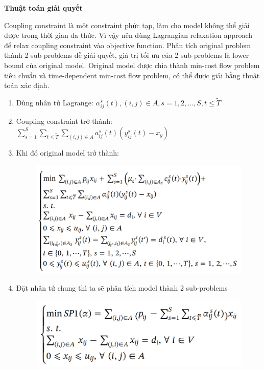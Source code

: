 \documentclass[a4paper]{article}
\begin{document}
\textbf{Thuật toán giải quyết}

{Coupling constraint là một constraint phức tạp, làm cho model không thể giải được trong thời gian đa thức. Vì vậy nên dùng Lagrangian relaxation approach để relax coupling constraint vào objective function. Phân tích original problem thành 2 sub-problems dễ giải quyết, giá trị tối ưu của 2 sub-problems là lower bound của original model. Original model được chia thành min-cost flow problem tiêu chuẩn và time-dependent min-cost flow problem, có thể được giải bằng thuật toán xác định.}
\begin{enumerate}
    \item[] Dùng nhân tử Lagrange: $\alpha_{ij}^s(t), (i,j) \in A, s = 1, 2,...,S, t\leq \widetilde T$
    \item[] Coupling constraint trở thành: $ \sum_{s=1}^S\sum_{t \leq \widetilde T}\sum_{(i,j)\in A} a_{ij}^s(t)(y_{ij}^s(t)-x_y)$
    \item[] Khi đó original model trở thành:
    \begin{figure}[h]
        \centering
        \includegraphics[width=0.5\linewidth]{image3.png}
    \end{figure}
    \newpage
    \item[] Đặt nhân tử chung thì ta sẽ phân tích model thành 2 sub-problems
    \begin{figure}[h]
        \centering
        \includegraphics[width=0.5\linewidth]{image4.png}   
    \end{figure}
   

\end{enumerate}
\end{document}
